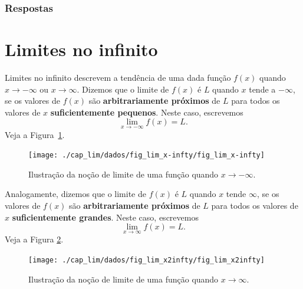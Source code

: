 \ifisbook
\subsubsection{Respostas}
\shipoutAnswer
\fi


\section{Limites no infinito}\label{cap_lim_sec_liminf}

Limites no infinito descrevem a tendência de uma dada função $f(x)$ quando $x\to -\infty$ ou $x\to\infty$. Dizemos que o limite de $f(x)$ é $L$ quando $x$ tende a $-\infty$, se os valores de $f(x)$ são {\bf arbitrariamente próximos} de $L$ para todos os valores de $x$ {\bf suficientemente pequenos}. Neste caso, escrevemos
\begin{equation}
  \lim_{x\to -\infty} f(x) = L.
\end{equation}
Veja a Figura~\ref{fig:lim_x-infty}.

\begin{figure}[H]
  \centering
  \texttt{[image: ./cap\_lim/dados/fig\_lim\_x-infty/fig\_lim\_x-infty]}
  \caption{Ilustração da noção de limite de uma função quando $x\to -\infty$.}
  \label{fig:lim_x-infty}
\end{figure}

Analogamente, dizemos que o limite de $f(x)$ é $L$ quando $x$ tende $\infty$, se os valores de $f(x)$ são {\bf arbitrariamente próximos} de $L$ para todos os valores de $x$ {\bf suficientemente grandes}. Neste caso, escrevemos
\begin{equation}
  \lim_{x\to \infty} f(x) = L.
\end{equation}
Veja a Figura \ref{fig:lim_x2infty}.

\begin{figure}[H]
  \centering
  \texttt{[image: ./cap\_lim/dados/fig\_lim\_x2infty/fig\_lim\_x2infty]}
  \caption{Ilustração da noção de limite de uma função quando $x\to \infty$.}
  \label{fig:lim_x2infty}
\end{figure}


